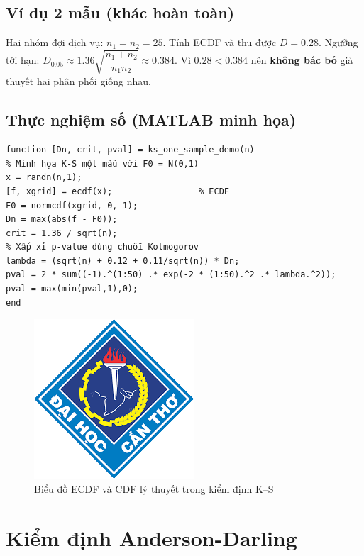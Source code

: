 \subsection{Ví dụ 2 mẫu (khác hoàn toàn)}
Hai nhóm đợi dịch vụ: $n_1=n_2=25$. Tính ECDF và thu được $D=0.28$. Ngưỡng tới hạn: $D_{0.05}\approx1.36\sqrt{\dfrac{n_1+n_2}{n_1n_2}}\approx0.384$. Vì $0.28<0.384$ nên \textbf{không bác bỏ} giả thuyết hai phân phối giống nhau.

\subsection{Thực nghiệm số (MATLAB minh họa)}
\begin{matlab}
\begin{lstlisting}
function [Dn, crit, pval] = ks_one_sample_demo(n)
% Minh họa K-S một mẫu với F0 = N(0,1)
x = randn(n,1);
[f, xgrid] = ecdf(x);                 % ECDF
F0 = normcdf(xgrid, 0, 1);
Dn = max(abs(f - F0));
crit = 1.36 / sqrt(n);
% Xấp xỉ p-value dùng chuỗi Kolmogorov
lambda = (sqrt(n) + 0.12 + 0.11/sqrt(n)) * Dn;
pval = 2 * sum((-1).^(1:50) .* exp(-2 * (1:50).^2 .* lambda.^2));
pval = max(min(pval,1),0);
end
\end{lstlisting}
\end{matlab}

\begin{figure}[h!]
    \centering
    \includegraphics[width=.75\linewidth]{../../assets/logos/university-logo.png}
    \caption{Biểu đồ ECDF và CDF lý thuyết trong kiểm định K--S}
\end{figure}

\section{Kiểm định Anderson-Darling}

